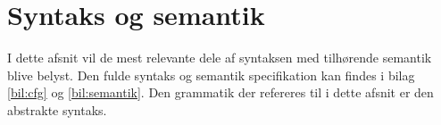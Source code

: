 \section{Syntaks og semantik}\label{sec:Syntax}
I dette afsnit vil de mest relevante dele af syntaksen med tilhørende semantik blive belyst. Den fulde syntaks og semantik specifikation kan findes i bilag \ref{bil:cfg} og \ref{bil:semantik}. Den grammatik der refereres til i dette afsnit er den abstrakte syntaks.





